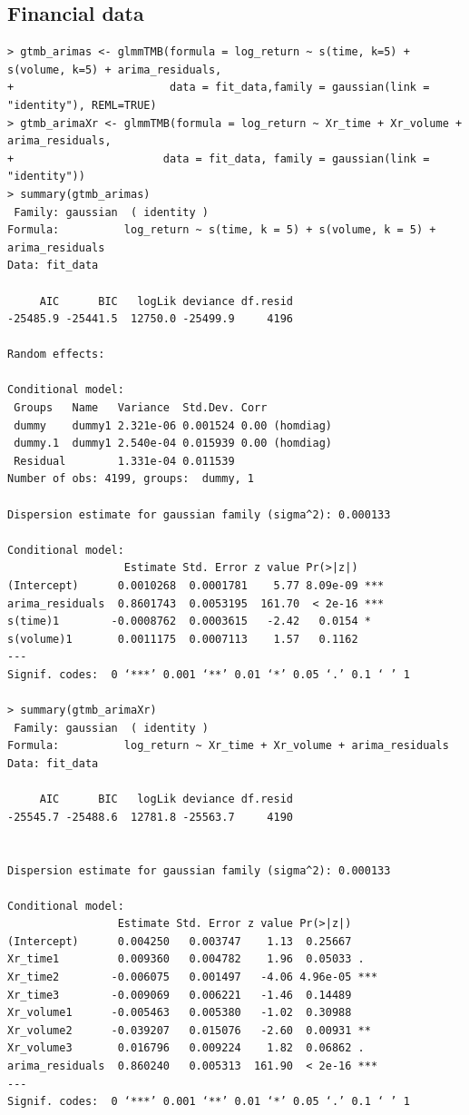 \subsection{Financial data}
\begin{verbatim}
> gtmb_arimas <- glmmTMB(formula = log_return ~ s(time, k=5) + s(volume, k=5) + arima_residuals,
+                        data = fit_data,family = gaussian(link = "identity"), REML=TRUE)
> gtmb_arimaXr <- glmmTMB(formula = log_return ~ Xr_time + Xr_volume + arima_residuals,
+                       data = fit_data, family = gaussian(link = "identity"))
> summary(gtmb_arimas)
 Family: gaussian  ( identity )
Formula:          log_return ~ s(time, k = 5) + s(volume, k = 5) + arima_residuals
Data: fit_data

     AIC      BIC   logLik deviance df.resid 
-25485.9 -25441.5  12750.0 -25499.9     4196 

Random effects:

Conditional model:
 Groups   Name   Variance  Std.Dev. Corr          
 dummy    dummy1 2.321e-06 0.001524 0.00 (homdiag)
 dummy.1  dummy1 2.540e-04 0.015939 0.00 (homdiag)
 Residual        1.331e-04 0.011539               
Number of obs: 4199, groups:  dummy, 1

Dispersion estimate for gaussian family (sigma^2): 0.000133 

Conditional model:
                  Estimate Std. Error z value Pr(>|z|)    
(Intercept)      0.0010268  0.0001781    5.77 8.09e-09 ***
arima_residuals  0.8601743  0.0053195  161.70  < 2e-16 ***
s(time)1        -0.0008762  0.0003615   -2.42   0.0154 *  
s(volume)1       0.0011175  0.0007113    1.57   0.1162    
---
Signif. codes:  0 ‘***’ 0.001 ‘**’ 0.01 ‘*’ 0.05 ‘.’ 0.1 ‘ ’ 1

> summary(gtmb_arimaXr)
 Family: gaussian  ( identity )
Formula:          log_return ~ Xr_time + Xr_volume + arima_residuals
Data: fit_data

     AIC      BIC   logLik deviance df.resid 
-25545.7 -25488.6  12781.8 -25563.7     4190 


Dispersion estimate for gaussian family (sigma^2): 0.000133 

Conditional model:
                 Estimate Std. Error z value Pr(>|z|)    
(Intercept)      0.004250   0.003747    1.13  0.25667    
Xr_time1         0.009360   0.004782    1.96  0.05033 .  
Xr_time2        -0.006075   0.001497   -4.06 4.96e-05 ***
Xr_time3        -0.009069   0.006221   -1.46  0.14489    
Xr_volume1      -0.005463   0.005380   -1.02  0.30988    
Xr_volume2      -0.039207   0.015076   -2.60  0.00931 ** 
Xr_volume3       0.016796   0.009224    1.82  0.06862 .  
arima_residuals  0.860240   0.005313  161.90  < 2e-16 ***
---
Signif. codes:  0 ‘***’ 0.001 ‘**’ 0.01 ‘*’ 0.05 ‘.’ 0.1 ‘ ’ 1




\end{verbatim}
